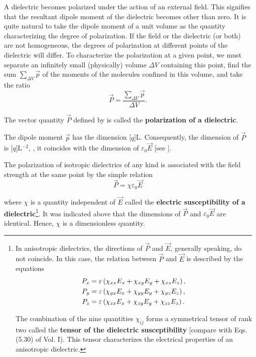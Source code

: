 A dielectric becomes polarized under the action of an external field. This signifies that the resultant dipole moment of the dielectric becomes other than zero. It is quite natural to take the dipole moment of a unit volume as the quantity characterizing the degree of polarization. If the field or the dielectric (or both) are not homogeneous, the degrees of polarization at different points of the dielectric will differ. To characterize the polarization at a given point, we must separate an infinitely small (physically) volume $\Delta{V}$ containing this point, find the sum $\sum_{\Delta{V}}\vec{p}$ of the moments of the molecules confined in this volume, and take the ratio
\begin{equation}\label{eq:2_4}
    \vec{P} = \frac{\displaystyle\sum_{\Delta{V}}\vec{p}}{\Delta{V}}.
\end{equation}

\noindent
The vector quantity $\vec{P}$ defined by  is called the \textbf{polarization of a dielectric}.

The dipole moment $\vec{p}$ has the dimension [$q$]L. Consequently, the dimension of $\vec{P}$ is [$q$]L$^{-2}$, \ie, it coincides with the dimension of $\varepsilon_0\vec{E}$ [see ].

The polarization of isotropic dielectrics of any kind is associated with the field strength at the same point by the simple relation
\begin{equation}\label{eq:2_5}
    \vec{P} = \chi \varepsilon_0 \vec{E}
\end{equation}

\noindent
where $\chi$ is a quantity independent of $\vec{E}$ called the \textbf{electric susceptibility of a dielectric}\footnote{In anisotropic dielectrics, the directions of $\vec{P}$ and $\vec{E}$, generally speaking,
do not coincide. In this case, the relation between $\vec{P}$ and $\vec{E}$ is described by the equations
\begin{align*}
    P_x &= \varepsilon\left(\chi_{xx}E_x + \chi_{xy}E_y+\chi_{xz}E_z\right),\\
    P_y &= \varepsilon\left(\chi_{yx}E_x + \chi_{yy}E_y+\chi_{yz}E_z\right),\\
    P_z &= \varepsilon\left(\chi_{zx}E_x + \chi_{zy}E_y+\chi_{zz}E_z\right).
\end{align*}

\noindent
The combination of the nine quantities $\chi_{ij}$ forms a symmetrical tensor of rank two called the \textbf{tensor of the dielectric susceptibility} [compare with Eqs. (5.30)
of Vol. I). This tensor characterizes the electrical properties of an anisotropic dielectric.}. It was indicated above that the dimensions of $\vec{P}$ and $\varepsilon_0\vec{E}$ are identical. Hence, $\chi$ is a dimensionless quantity.

